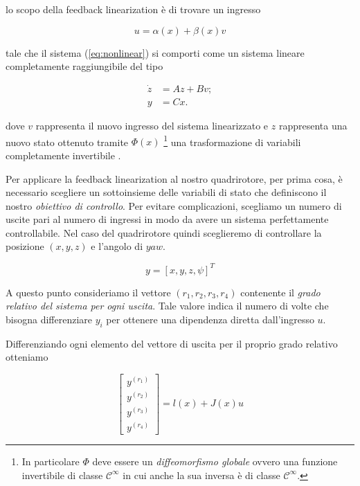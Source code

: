 \documentclass[a4paper,10pt]{article}
\begin{document}
lo scopo della feedback linearization è di trovare un ingresso

\begin{equation}
u = \alpha(x) + \beta(x)v
\label{eq:u}
\end{equation}

tale che il sistema (\ref{eq:nonlinear}) si comporti come un sistema lineare completamente raggiungibile del tipo

\begin{equation}
\begin{split}
\dot{z} &= Az + Bv; \\
y &= Cx.
\end{split}
\label{eq: linear}
\end{equation}

dove $v$ rappresenta il nuovo ingresso del sistema linearizzato e $z$ rappresenta una nuovo stato ottenuto tramite $\Phi(x)$ \footnote{In particolare $\Phi$ deve essere un \emph{diffeomorfismo globale} ovvero una funzione invertibile di classe $\mathcal{C}^{\infty}$ in cui anche la sua inversa è di classe $\mathcal{C}^{\infty}$.} una trasformazione di variabili completamente invertibile .

Per applicare la feedback linearization al nostro quadrirotore, per prima cosa, è necessario scegliere un sottoinsieme delle variabili di stato che definiscono il nostro \emph{obiettivo di controllo}. Per evitare complicazioni, scegliamo un numero di uscite pari al numero di ingressi in modo da avere un sistema perfettamente controllabile. Nel caso del quadrirotore quindi sceglieremo di controllare la posizione $(x,y,z)$ e l'angolo di $yaw$.

\begin{equation}
y = [x,y,z,\psi]^T
\end{equation}

A questo punto consideriamo il vettore $(r_1,r_2,r_3,r_4)$ contenente il \emph{grado relativo del sistema per ogni uscita}. Tale valore indica il numero di volte che bisogna differenziare $y_i$ per ottenere una dipendenza diretta dall'ingresso $u$.

Differenziando ogni elemento del vettore di uscita per il proprio grado relativo otteniamo

\begin{equation}
\left[ \begin{array}{c} y^{(r_1)} \\ y^{(r_2)} \\ y^{(r_3)} \\ y^{(r_4)} \end{array} \right] = l(x) + J(x)u
\label{eq:lju}
\end{equation}
\end{document}
